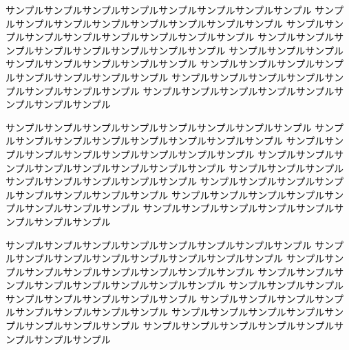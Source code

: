 サンプルサンプルサンプルサンプルサンプルサンプルサンプルサンプル
サンプルサンプルサンプルサンプルサンプルサンプルサンプルサンプル
サンプルサンプルサンプルサンプルサンプルサンプルサンプルサンプル
サンプルサンプルサンプルサンプルサンプルサンプルサンプルサンプル
サンプルサンプルサンプルサンプルサンプルサンプルサンプルサンプル
サンプルサンプルサンプルサンプルサンプルサンプルサンプルサンプル
サンプルサンプルサンプルサンプルサンプルサンプルサンプルサンプル
サンプルサンプルサンプルサンプルサンプルサンプルサンプルサンプル


サンプルサンプルサンプルサンプルサンプルサンプルサンプルサンプル
サンプルサンプルサンプルサンプルサンプルサンプルサンプルサンプル
サンプルサンプルサンプルサンプルサンプルサンプルサンプルサンプル
サンプルサンプルサンプルサンプルサンプルサンプルサンプルサンプル
サンプルサンプルサンプルサンプルサンプルサンプルサンプルサンプル
サンプルサンプルサンプルサンプルサンプルサンプルサンプルサンプル
サンプルサンプルサンプルサンプルサンプルサンプルサンプルサンプル
サンプルサンプルサンプルサンプルサンプルサンプルサンプルサンプル


サンプルサンプルサンプルサンプルサンプルサンプルサンプルサンプル
サンプルサンプルサンプルサンプルサンプルサンプルサンプルサンプル
サンプルサンプルサンプルサンプルサンプルサンプルサンプルサンプル
サンプルサンプルサンプルサンプルサンプルサンプルサンプルサンプル
サンプルサンプルサンプルサンプルサンプルサンプルサンプルサンプル
サンプルサンプルサンプルサンプルサンプルサンプルサンプルサンプル
サンプルサンプルサンプルサンプルサンプルサンプルサンプルサンプル
サンプルサンプルサンプルサンプルサンプルサンプルサンプルサンプル